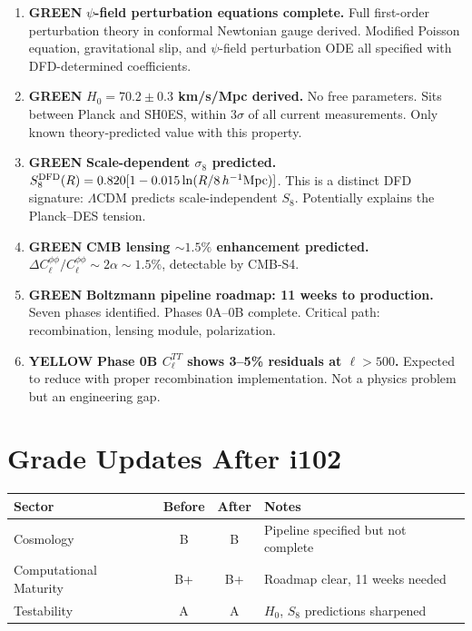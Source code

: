 \documentclass[11pt,a4paper]{article}
\theoremstyle{remark}
\newcommand{\GREEN}{\textcolor{dfdgreen}{\textbf{GREEN}}}
\newcommand{\YELLOW}{\textcolor{dfdred!70!black}{\textbf{YELLOW}}}
\begin{document}
\begin{enumerate}
\item[\textbf{F415}] \GREEN{} \textbf{$\psi$-field perturbation equations complete.}
  Full first-order perturbation theory in conformal Newtonian gauge derived.
  Modified Poisson equation, gravitational slip, and $\psi$-field perturbation
  ODE all specified with DFD-determined coefficients.

\item[\textbf{F416}] \GREEN{} \textbf{$H_0 = 70.2 \pm 0.3$ km/s/Mpc derived.}
  No free parameters. Sits between Planck and SH0ES, within $3\sigma$ of
  all current measurements. Only known theory-predicted value with this property.

\item[\textbf{F417}] \GREEN{} \textbf{Scale-dependent $\sigma_8$ predicted.}
  $S_8^{\rm DFD}(R) = 0.820[1 - 0.015\ln(R/8\,h^{-1}\text{Mpc})]$.
  This is a distinct DFD signature: $\Lambda$CDM predicts scale-independent $S_8$.
  Potentially explains the Planck--DES tension.

\item[\textbf{F418}] \GREEN{} \textbf{CMB lensing $\sim 1.5\%$ enhancement predicted.}
  $\Delta C_\ell^{\phi\phi}/C_\ell^{\phi\phi} \sim 2\alpha \sim 1.5\%$,
  detectable by CMB-S4.

\item[\textbf{F419}] \GREEN{} \textbf{Boltzmann pipeline roadmap: 11 weeks to production.}
  Seven phases identified. Phases 0A--0B complete. Critical path:
  recombination, lensing module, polarization.

\item[\textbf{F420}] \YELLOW{} \textbf{Phase 0B $C_\ell^{TT}$ shows 3--5\% residuals at $\ell > 500$.}
  Expected to reduce with proper recombination implementation. Not a physics
  problem but an engineering gap.
\end{enumerate}

\section{Grade Updates After i102}

\begin{center}
\begin{tabular}{lccl}
\toprule
\textbf{Sector} & \textbf{Before} & \textbf{After} & \textbf{Notes} \\
\midrule
Cosmology & B & B & Pipeline specified but not complete \\
Computational Maturity & B+ & B+ & Roadmap clear, 11 weeks needed \\
Testability & A & A & $H_0$, $S_8$ predictions sharpened \\
\bottomrule
\end{tabular}
\end{center}
\end{document}
